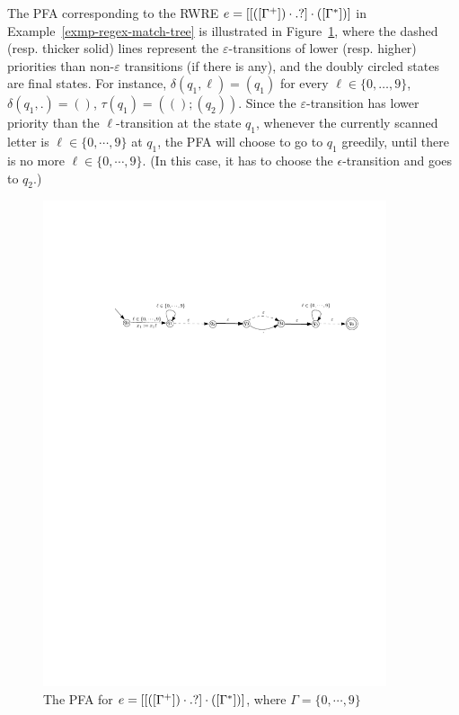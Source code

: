\begin{example}\label{exmp-pfa}
The PFA corresponding to the RWRE $e = [[([\Gamma^+])\cdot .?] \cdot ([\Gamma^*])]$ in Example~\ref{exmp-regex-match-tree} is illustrated in Figure~\ref{fig-pfa}, where the dashed (resp. thicker solid) lines represent the $\varepsilon$-transitions of lower (resp. higher) priorities than non-$\varepsilon$ transitions (if there is any), and the doubly circled states are final states. For instance, $\delta(q_1, \ell) = (q_1)$ for every $\ell \in \{0, \dots, 9\}$, $\delta(q_1, .) = ()$, $\tau(q_1) = ((); (q_2))$. Since the $\varepsilon$-transition has lower priority than the $\ell$-transition at the state $q_1$, whenever the currently scanned letter is $\ell \in \{0,\cdots,9\}$ at $q_1$,  the PFA will choose to go to $q_1$ greedily, until there is no more $\ell  \in \{0,\cdots,9\}$. (In this case, it has to choose the $\epsilon$-transition and goes to $q_2$.)
%
\begin{figure}[ht]
\centering
\includegraphics[width=0.9\textwidth]{pfa-new.pdf}
\caption{The PFA for $e = [[([\Gamma^+])\cdot .?] \cdot ([\Gamma^*])]$, where $\Gamma = \{0, \cdots, 9\}$}
\label{fig-pfa}
\end{figure}
\end{example}

